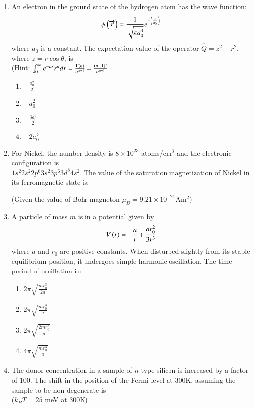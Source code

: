 \documentclass[journal,9pt,onecolumn]{IEEEtran}
\begin{document}
\begin{enumerate}

\item An electron in the ground state of the hydrogen atom has the wave function: $$\psi \left(\overrightarrow{r}\right) = \frac{1}{\sqrt{\pi a_0^3}} e^{-\left(\frac{r}{a_0}\right)}$$ where $a_0$ is a constant. The expectation value of the operator $\hat{Q} = z^2 - r^2$, where $z = r \cos \theta$, is\\(Hint: $\int_0^\infty e^{-ar} r^ndr=\frac{\Gamma\left(n\right)}{\alpha^{n+1}}=\frac{\left(n-1\right)!}{\alpha^{n+!}}$
\begin{multicols}{4}
\begin{enumerate}
    \item $-\frac{a_0^2}{2}$
    \item $-a_0^2$
    \item $-\frac{3a_0^2}{2}$
    \item $-2a_0^2$
\end{enumerate}
\end{multicols}

\item For Nickel, the number density is $8 \times 10^{23}$ atoms/cm$^3$ and the electronic configuration is \\$1 s^2 2 s^2 2 p^6 3 s^2 3 p^6 3 d^8 4 s^2$. The value of the saturation magnetization of Nickel in its ferromagnetic state is:

(Given the value of Bohr magneton $\mu_B = 9.21 \times 10^{-21}$Am$^2$)


\item A particle of mass $m$ is in a potential given by $$V \left(r\right) = -\frac{a}{r} + \frac{a r_0^2}{3 r^3}$$ where $a$ and $r_0$ are positive constants. When disturbed slightly from its stable equilibrium position, it undergoes simple harmonic oscillation. The time period of oscillation is:

\begin{multicols}{4}
\begin{enumerate}
    \item $2\pi \sqrt{\frac{m r_0^3}{2a}}$
    \item $2\pi \sqrt{\frac{m r_0^3}{a}}$
    \item $2\pi \sqrt{\frac{2 m r_0^3}{a}}$
    \item $4\pi \sqrt{\frac{m r_0^3}{a}}$
\end{enumerate}
\end{multicols}

\item The donor concentration in a sample of $n$-type silicon is increased by a factor of 100. The shift in the position of the Fermi level at 300K, assuming the sample to be non-degenerate is \\  
($k_B T = 25$ meV at 300K)





\end{enumerate}
\end{document}
